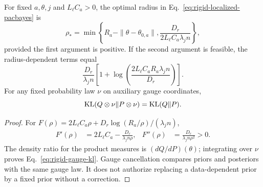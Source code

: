 \begin{corollary}
For fixed $a,\theta,j$ and $L_\ell C_a>0$, the optimal radius in
Eq.~\eqref{eq:rigid-localized-pacbayes} is
\begin{equation}
\rho_*=\min\left\{R_a-\|\theta-\theta_{0,a}\|,
\frac{D_r}{2L_\ell C_a\lambda_jn}\right\},
\end{equation}
provided the first argument is positive. If the second argument is
feasible, the radius-dependent terms equal
\begin{equation}
\frac{D_r}{\lambda_jn}
\left[1+\log\!\left(
\frac{2L_\ell C_aR_a\lambda_jn}{D_r}\right)\right].
\end{equation}
For any fixed probability law $\nu$ on auxiliary gauge coordinates,
\begin{equation}
{\rm KL}(Q\otimes\nu\|P\otimes\nu)={\rm KL}(Q\|P).
\label{eq:rigid-gauge-kl}
\end{equation}
\end{corollary}
\begin{proof}
For $F(\rho)=2L_\ell C_a\rho+
D_r\log(R_a/\rho)/(\lambda_jn)$,
\begin{align}
F'(\rho)&=2L_\ell C_a-\frac{D_r}{\lambda_jn\rho},&
F''(\rho)&=\frac{D_r}{\lambda_jn\rho^2}>0 .
\end{align}
The density ratio for the product measures is
$(dQ/dP)(\theta)$; integrating over $\nu$ proves
Eq.~\eqref{eq:rigid-gauge-kl}. Gauge cancellation compares priors and
posteriors with the same gauge law. It does not authorize replacing a
data-dependent prior by a fixed prior without a correction.
\end{proof}
